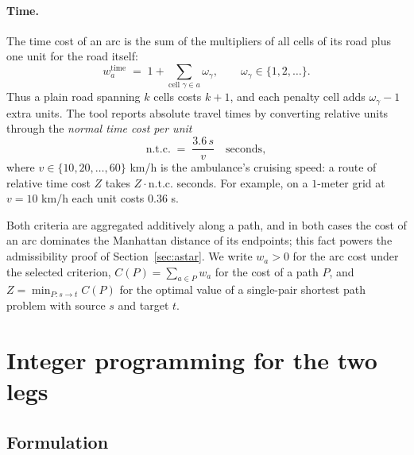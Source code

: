 \documentclass[10pt,twocolumn]{article}
\begin{document}
\paragraph{Time.}
The time cost of an arc is the sum of the multipliers of all cells of its road plus one
unit for the road itself:
\[
  w^{\mathrm{time}}_a \;=\; 1 + \sum_{\text{cell } \gamma \in a} \omega_\gamma,
  \qquad \omega_\gamma \in \{1,2,\dots\}.
\]
Thus a plain road spanning $k$ cells costs $k+1$, and each penalty cell adds
$\omega_\gamma - 1$ extra units. The tool reports absolute travel times by converting
relative units through the \emph{normal time cost per unit}
\[
  \mathrm{n.t.c.} \;=\; \frac{3.6\,s}{v} \quad\text{seconds},
\]
where $v\in\{10,20,\dots,60\}$ km/h is the ambulance's cruising speed: a route of relative
time cost $Z$ takes $Z\cdot \mathrm{n.t.c.}$ seconds. For example, on a $1$-meter grid at
$v=10$ km/h each unit costs $0.36$ s.

Both criteria are aggregated additively along a path, and in both cases the cost of an arc
dominates the Manhattan distance of its endpoints; this fact powers the admissibility proof
of Section~\ref{sec:astar}. We write $w_a>0$ for the arc cost under the selected criterion,
$C(P)=\sum_{a\in P} w_a$ for the cost of a path $P$, and
$Z = \min_{P: s\to t} C(P)$ for the optimal value of a single-pair shortest path problem
with source $s$ and target $t$.

\section{Integer programming for the two legs}
\label{sec:ip}

\subsection{Formulation}
\end{document}
